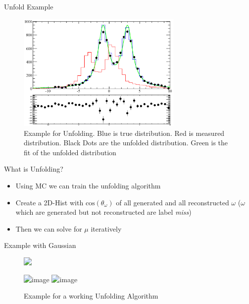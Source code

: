 \documentclass[
		10pt
		]{beamer}
\begin{document}
\begin{frame}{Unfold Example}




	\begin{figure}
		\vspace{0cm} 
		
		\includegraphics[width=8.0cm]{Plots/Tim}
		\captionsetup{labelformat=empty}
		\caption{Example for Unfolding. Blue is true distribution. Red is measured distribution. Black Dots are the unfolded distribution. Green is the fit of the unfolded distribution}
	\end{figure}
	
	

	
	
\end{frame}





\iffalse


\begin{frame}{What is Unfolding?} 
\begin{itemize} 
		\item  Using MC we can train the unfolding algorithm
		\item Create a 2D-Hist with $ \textrm{cos}(\theta_{\omega}) $ of all generated and all reconstructed $\omega$ ($\omega$ which are generated but not reconstructed are label \textit{miss})
		\item Then we can solve for $\mu$ iteratively	
	\end{itemize}

\end{frame}


\begin{frame}{Example with Gaussian}
	
\begin{figure}
	\includegraphics<1>[width=8cm]{Plots/truth}

	\includegraphics<2>[width=8cm]{Plots/meas_truth}
	\includegraphics<3>[width=8cm]{Plots/folded}
	\captionsetup{labelformat=empty}
	\caption{Example for a working Unfolding Algorithm}
\end{figure}
	
	
\end{frame}
\end{document}
